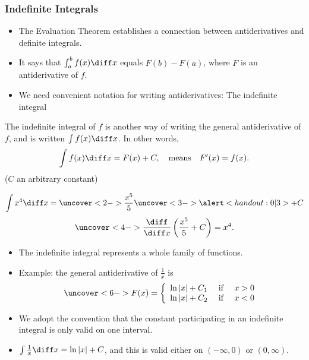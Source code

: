 \begin{frame}\frametitle{Indefinite Integrals}
\begin{itemize}
\item  The Evaluation Theorem establishes a connection between antiderivatives and definite integrals.
\item  It says that $\int_a^b f(x)\diff x$ equals $F(b) - F(a)$, where $F$ is an antiderivative of $f$.
\item  We need convenient notation for writing antiderivatives: The indefinite integral
\end{itemize}
\begin{definition}
The indefinite integral of $f$ is another way of writing the general antiderivative of $f$, and is written $\int f(x) \diff x$.  In other words,
\abovedisplayskip=0pt
\belowdisplayskip=0pt
\[
\int f(x) \diff x = F(x)+C, \quad \text{means} \quad F'(x) = f(x). 
\]
($ C $ an arbitrary constant)

\end{definition}
\end{frame}

\begin{frame}
\begin{example}
\abovedisplayskip=0pt
\belowdisplayskip=0pt
\[
\int x^4 \diff x = \uncover<2->{\frac{x^5}{5}} \uncover<3->{\alert<handout:0| 3>{+ C}}
\]
\abovedisplayskip=0pt
\belowdisplayskip=0pt
\[
\uncover<4->{\frac{\diff}{\diff x}\left( \frac{x^5}{5} + C\right) = x^4.}
\]
\end{example}
\begin{itemize}
\item<5->  The indefinite integral represents a whole family of functions.
\item<6->  Example: %
the general antiderivative of $\frac{1}{x}$ is
\abovedisplayskip=0pt
\belowdisplayskip=0pt
\[
\uncover<6->{%
F(x) = \left\{ \begin{array}{ccc}
\ln |x| + C_1 & \text{ if } & x > 0\\
\ln |x| + C_2 & \text{ if } & x < 0
\end{array}\right.
}%
\]
\item<7->  We adopt the convention that the constant participating in an indefinite integral is only valid on one interval.
\item<8->  $\int \frac{1}{x} \diff x = \ln |x| + C$, and this is valid either on $(-\infty , 0)$ or $(0, \infty)$.
\end{itemize}
\end{frame}
